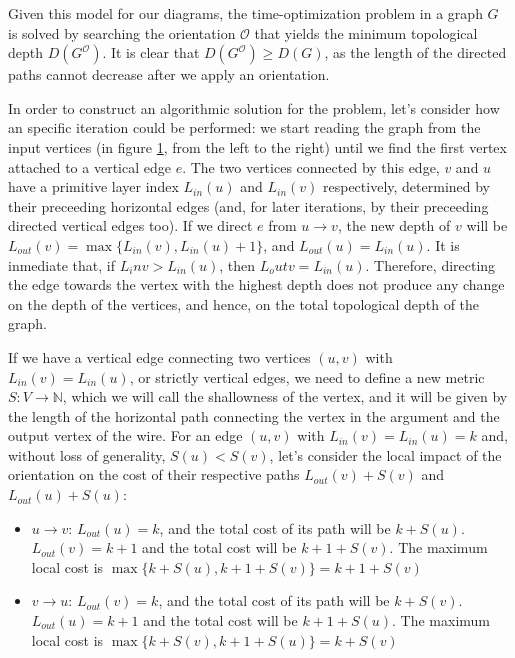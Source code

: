 \documentclass[12pt, twoside, openany]{book}
\begin{document}
\begin{figure}
    \centering
    
    \caption{}
    \label{fig:graph_model}
\end{figure}

Given this model for our diagrams, the time-optimization problem in a graph $G$ is solved by searching the orientation $\mathcal{O}$ that yields the minimum topological depth $D(G^\mathcal{O})$. It is clear that $D(G^\mathcal{O}) \geq D(G)$, as the length of the directed paths cannot decrease after we apply an orientation. 

In order to construct an algorithmic solution for the problem, let's consider how an specific iteration could be performed: we start reading the graph from the input vertices (in figure \ref{fig:graph_model}, from the left to the right) until we find the first vertex attached to a vertical edge $e$. The two vertices connected by this edge, $v$ and $u$ have a primitive layer index $L_{in}(u)$ and $L_{in}(v)$ respectively, determined by their preceeding horizontal edges (and, for later iterations, by their preceeding directed vertical edges too). If we direct $e$ from $u \rightarrow v$, the new depth of $v$ will be $L_{out}(v) = \max \{L_{in}(v), L_{in}(u) + 1\}$, and $L_{out}(u) = L_{in}(u)$. It is inmediate that, if $L_in{v} > L_{in}(u)$, then $L_out{v} = L_{in}(u)$. Therefore, directing the edge towards the vertex with the highest depth does not produce any change on the depth of the vertices, and hence, on the total topological depth of the graph.

If we have a vertical edge connecting two vertices $(u,v)$ with $L_{in}(v) = L_{in}(u)$, or strictly vertical edges, we need to define a new metric $S: V \rightarrow \mathbb{N}$, which we will call the shallowness of the vertex, and it will be given by the length of the horizontal path connecting the vertex in the argument and the output vertex of the wire. For an edge $(u,v)$ with $L_{in}(v) = L_{in}(u) = k$ and, without loss of generality, $S(u) < S(v)$, let's consider the local impact of the orientation on the cost of their respective paths $L_{out}(v) + S(v)$ and $L_{out}(u) + S(u)$:
\begin{itemize}
    \item $u \rightarrow v$: $L_{out}(u) = k$, and the total cost of its path will be $k + S(u)$. $L_{out}(v) = k+1$ and the total cost will be $k+1 + S(v)$. The maximum local cost is $\max \{k + S(u), k + 1 + S(v)\} = k + 1 + S(v) $
    \item $v \rightarrow u$: $L_{out}(v) = k$, and the total cost of its path will be $k + S(v)$. $L_{out}(u) = k+1$ and the total cost will be $k+1 + S(u)$. The maximum local cost is $\max \{k + S(v), k + 1 + S(u)\} = k + S(v) $
\end{itemize}
\end{document}
